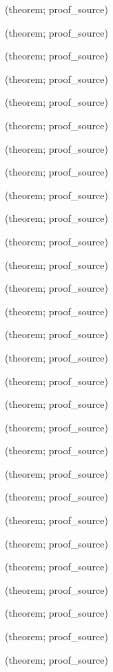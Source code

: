 \noindent{} {\scriptsize (theorem; proof\_source)}\par
\noindent{} {\scriptsize (theorem; proof\_source)}\par
\noindent{} {\scriptsize (theorem; proof\_source)}\par
\noindent{} {\scriptsize (theorem; proof\_source)}\par
\noindent{} {\scriptsize (theorem; proof\_source)}\par
\noindent{} {\scriptsize (theorem; proof\_source)}\par
\noindent{} {\scriptsize (theorem; proof\_source)}\par
\noindent{} {\scriptsize (theorem; proof\_source)}\par
\noindent{} {\scriptsize (theorem; proof\_source)}\par
\noindent{} {\scriptsize (theorem; proof\_source)}\par
\noindent{} {\scriptsize (theorem; proof\_source)}\par
\noindent{} {\scriptsize (theorem; proof\_source)}\par
\noindent{} {\scriptsize (theorem; proof\_source)}\par
\noindent{} {\scriptsize (theorem; proof\_source)}\par
\noindent{} {\scriptsize (theorem; proof\_source)}\par
\noindent{} {\scriptsize (theorem; proof\_source)}\par
\noindent{} {\scriptsize (theorem; proof\_source)}\par
\noindent{} {\scriptsize (theorem; proof\_source)}\par
\noindent{} {\scriptsize (theorem; proof\_source)}\par
\noindent{} {\scriptsize (theorem; proof\_source)}\par
\noindent{} {\scriptsize (theorem; proof\_source)}\par
\noindent{} {\scriptsize (theorem; proof\_source)}\par
\noindent{} {\scriptsize (theorem; proof\_source)}\par
\noindent{} {\scriptsize (theorem; proof\_source)}\par
\noindent{} {\scriptsize (theorem; proof\_source)}\par
\noindent{} {\scriptsize (theorem; proof\_source)}\par
\noindent{} {\scriptsize (theorem; proof\_source)}\par
\noindent{} {\scriptsize (theorem; proof\_source)}\par
\noindent{} {\scriptsize (theorem; proof\_source)}\par
\endgroup
